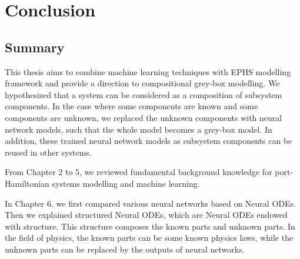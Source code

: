 \documentclass[
	parskip, 			   %
	twoside, 			   %
	DIV=14, 			   %
	BCOR=15.0mm, 		   %
	headsepline, 		   %
	open=right, 		   %
	captions=tableheading, %
	bibliography=totoc,    %
	numbers=noenddot       %
]{scrreprt}
\begin{document}
\begin{figure}[h!]
    \label{fig:ndho_experiment_with_EPHS_structure_reuse}
\end{figure}

\clearpage
\chapter{Conclusion}
\label{ch:chapter8}
\section{Summary}
This thesis aims to combine machine learning techniques with EPHS modelling framework and provide a direction to compositional grey-box modelling. We hypothesized that a system can be considered as a composition of subsystem components. In the case where some components are known and some components are unknown, we replaced the unknown components with neural network models, such that the whole model becomes a grey-box model. In addition, these trained neural network models as subsystem components can be reused in other systems.

From Chapter 2 to 5, we reviewed fundamental background knowledge for port-Hamiltonian systems modelling and machine learning. 

In Chapter 6, we first compared various neural networks based on Neural ODEs. Then we explained structured Neural ODEs, which are Neural ODEs endowed with structure. This structure composes the known parts and unknown parts. In the field of physics, the known parts can be some known physics laws, while the unknown parts can be replaced by the outputs of neural networks.
\end{document}
